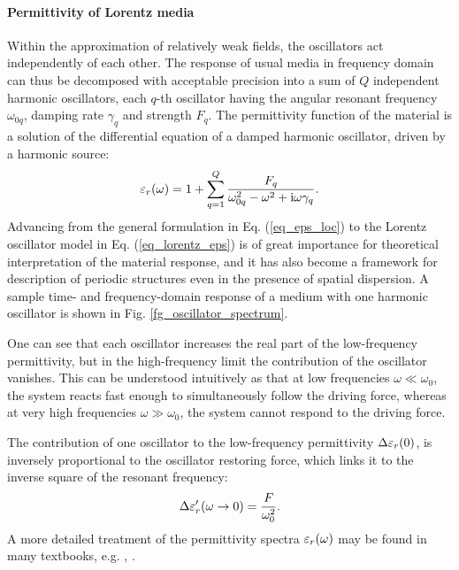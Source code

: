 \paragraph{Permittivity of Lorentz media} Within the approximation of relatively weak fields, the oscillators act independently of each other.
The response of usual media in frequency domain can thus be decomposed with acceptable precision into a sum of $Q$ independent harmonic oscillators, each $q$-th oscillator having the angular resonant frequency $\omega_{0q}$, damping rate $\gamma_q$ and strength $F_q$.
The permittivity function of the material is a solution of the differential equation of a damped harmonic oscillator, driven by a harmonic source:
\begin{equation} \varepsilon_r(\omega) = 1 + \sum_{q=1}^Q \frac{F_q}{\omega_{0q}^2 - \omega^2 + {\mathrm i}\omega\gamma_q}. \label{eq_lorentz_eps}\end{equation} 
Advancing from the general formulation in Eq. (\ref{eq_eps_loc}) to the Lorentz oscillator model in Eq. (\ref{eq_lorentz_eps}) is of great importance for theoretical interpretation of the material response, and it has also become a framework for description of periodic structures even in the presence of spatial dispersion.  %
A sample time- and frequency-domain response of a medium with one harmonic oscillator is shown in Fig. \ref{fg_oscillator_spectrum}.

One can see that each oscillator increases the real part of the low-frequency permittivity, but in the high-frequency limit the contribution of the oscillator vanishes. This can be understood intuitively as that at low frequencies $\omega \ll \omega_0$, the system reacts fast enough to simultaneously follow the driving force, whereas at very high frequencies $\omega \gg \omega_0$, the system cannot respond to the driving force.

The contribution of one oscillator to the low-frequency permittivity $\Delta\varepsilon_r(0)$, is inversely proportional to the oscillator restoring force, which links it to the inverse square of the resonant frequency:
\begin{equation} \Delta \varepsilon_r'(\omega\rightarrow0) = \frac{F}{\omega_0^{2}}.  \label{eq_delta_eps} \end{equation}
A more detailed treatment of the permittivity spectra $\varepsilon_r(\omega)$ may be found in many textbooks, e.g. \cite[p. 454]{klingshirn2007semiconductor}, \cite{dresselhaus1966optical}. 

